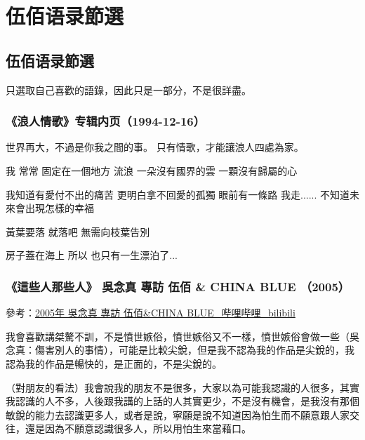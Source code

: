 \documentclass[UTF8,a4paper,oneside,twocolumn,12pt]{ctexbook}
\begin{document}
\onecolumn
\part{伍佰语录節選}
\chapter{伍佰语录節選}
只選取自己喜歡的語錄，因此只是一部分，不是很詳盡。
\section{《浪人情歌》专辑内页（1994-12-16）}
世界再大，不過是你我之間的事。
只有情歌，才能讓浪人四處為家。

我 常常 固定在一個地方 流浪
一朵沒有國界的雲 一顆沒有歸屬的心

我知道有愛付不出的痛苦
更明白拿不回愛的孤獨
眼前有一條路 我走......
不知道未來會出現怎樣的幸福

黃葉要落 就落吧
無需向枝葉告別

房子蓋在海上 所以 也只有一生漂泊了...

\section{《這些人那些人》 吳念真 專訪 伍佰 \& CHINA BLUE （2005）}
參考：\href{https://www.bilibili.com/video/BV1Jx411X79n}{2005年 吳念真 專訪 伍佰\&CHINA BLUE\_哔哩哔哩\_bilibili}

我會喜歡講桀驁不訓，不是憤世嫉俗，憤世嫉俗又不一樣，憤世嫉俗會做一些（吳念真：傷害別人的事情），可能是比較尖銳，但是我不認為我的作品是尖銳的，我認為我的作品是暢快的，是正面的，不是尖銳的。

（對朋友的看法）我會說我的朋友不是很多，大家以為可能我認識的人很多，其實我認識的人不多，人後跟我講的上話的人其實更少，不是沒有機會，是我沒有那個敏銳的能力去認識更多人，或者是說，寧願是說不知道因為怕生而不願意跟人家交往，還是因為不願意認識很多人，所以用怕生來當藉口。
\end{document}
